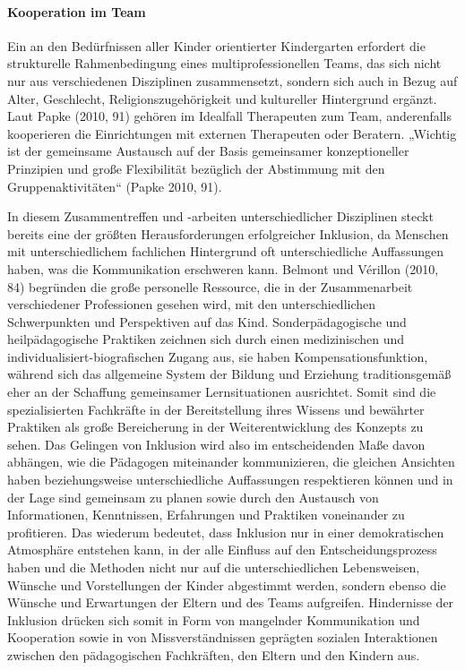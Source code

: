 \paragraph{Kooperation im Team}\label{Team}

Ein an den Bedürfnissen aller Kinder orientierter Kindergarten erfordert die strukturelle Rahmenbedingung eines multiprofessionellen Teams, das sich nicht nur aus verschiedenen Disziplinen zusammensetzt, sondern sich auch in Bezug auf Alter, Geschlecht, Religionszugehörigkeit und kultureller Hintergrund ergänzt.
Laut Papke (2010, 91) gehören im Idealfall Therapeuten zum Team, anderenfalls kooperieren die Einrichtungen mit externen Therapeuten oder Beratern. „Wichtig ist der gemeinsame Austausch auf der Basis gemeinsamer konzeptioneller Prinzipien und große Flexibilität bezüglich der Abstimmung mit den Gruppenaktivitäten“ (Papke 2010, 91).

In diesem Zusammentreffen und -arbeiten unterschiedlicher Disziplinen steckt bereits eine der größten Herausforderungen erfolgreicher Inklusion, da Menschen mit unterschiedlichem fachlichen Hintergrund  oft unterschiedliche Auffassungen haben, was die Kommunikation erschweren kann. 
Belmont und Vérillon (2010, 84) begründen die große personelle Ressource, die in der Zusammenarbeit verschiedener Professionen  gesehen wird, mit den unterschiedlichen Schwerpunkten und Perspektiven auf das Kind. Sonderpädagogische und heilpädagogische Praktiken zeichnen sich durch einen medizinischen und individualisiert-biografischen Zugang aus, sie haben Kompensationsfunktion, während sich das allgemeine System der Bildung und Erziehung traditionsgemäß eher an der Schaffung gemeinsamer Lernsituationen ausrichtet. Somit sind die spezialisierten Fachkräfte in der Bereitstellung ihres Wissens und bewährter Praktiken als große Bereicherung in der Weiterentwicklung des Konzepts zu sehen.
Das Gelingen von Inklusion wird also im entscheidenden Maße davon abhängen, wie die Pädagogen miteinander kommunizieren, die gleichen Ansichten haben beziehungsweise unterschiedliche Auffassungen respektieren können und in der Lage sind gemeinsam zu planen sowie durch den Austausch von Informationen, Kenntnissen, Erfahrungen und Praktiken voneinander zu profitieren. Das wiederum bedeutet, dass Inklusion nur in einer demokratischen Atmosphäre entstehen kann, in der alle Einfluss auf den Entscheidungsprozess haben und die Methoden nicht nur auf die unterschiedlichen Lebensweisen, Wünsche und Vorstellungen der Kinder abgestimmt werden, sondern ebenso die Wünsche und Erwartungen der Eltern und des Teams aufgreifen.
Hindernisse der Inklusion drücken sich somit in Form von mangelnder Kommunikation und Kooperation sowie in von Missverständnissen geprägten sozialen Interaktionen zwischen den pädagogischen Fachkräften, den Eltern und den Kindern aus.

